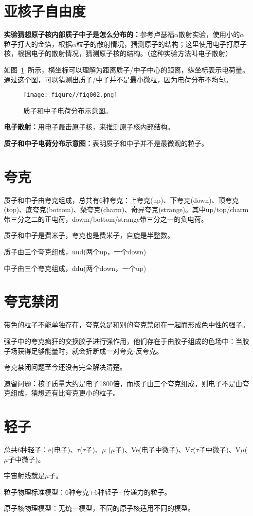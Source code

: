 \section{亚核子自由度}

\textbf{实验猜想原子核内部质子中子是怎么分布的：}参考卢瑟福$\alpha$散射实验，使用小的$\alpha$粒子打大的金箔，根据$\alpha$粒子的散射情况，猜测原子的结构；这里使用电子打原子核，根据电子的散射情况，猜测原子核的结构。（这种实验方法叫电子散射）

如图~\ref{fig002}~所示，横坐标可以理解为距离质子/中子中心的距离，纵坐标表示电荷量。通过这个图，可以猜测出质子/中子并不是最小微粒，因为电荷分布不均匀。

\begin{figure}[htbp]
    \centering
    \texttt{[image: figure//fig002.png]}
    \caption{\label{fig002}质子和中子电荷分布示意图。}
\end{figure}

\textbf{电子散射：}用电子轰击原子核，来推测原子核内部结构。

\textbf{质子和中子电荷分布示意图：}表明质子和中子并不是最微观的粒子。

\section{夸克}

质子和中子由夸克组成，总共有6种夸克：上夸克(up)、下夸克(down)、顶夸克(top)、底夸克(bottom)、粲夸克(charm)、奇异夸克(strange)。其中up/top/charm带三分之二的正电荷，dowm/bottom/strange带三分之一的负电荷。

质子和中子是费米子，夸克也是费米子，自旋是半整数。

质子由三个夸克组成，uud(两个up，一个down)

中子由三个夸克组成，ddu(两个down，一个up)

\section{夸克禁闭}

带色的粒子不能单独存在，夸克总是和别的夸克禁闭在一起而形成色中性的强子。

强子中的夸克疯狂的交换胶子进行强作用，他们存在于由胶子组成的色场中：当胶子场获得足够能量时，就会折断成一对夸克-反夸克。

夸克禁闭问题至今还没有完全解决清楚。

遗留问题：核子质量大约是电子1800倍，而核子由三个夸克组成，则电子不是由夸克组成，猜想还有比夸克更小的粒子。

\section{轻子}

总共6种轻子：e(电子)、$\tau$($\tau$子)、$\mu$ ($\mu$子)、Ve(电子中微子)、V$\tau$($\tau$子中微子)、V$\mu$($\mu$子中微子)。

宇宙射线就是$\mu$子。

粒子物理标准模型：6种夸克+6种轻子+传递力的粒子。

原子核物理模型：无统一模型，不同的原子核适用不同的模型。

\clearpage
